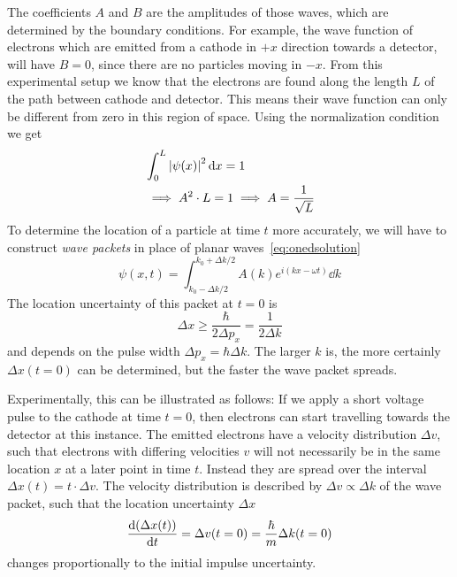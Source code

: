\documentclass[../../script.tex]{subfiles}
\begin{document}
The coefficients $A$ and $B$ are the amplitudes of those waves, which are determined by the boundary conditions.
For example, the wave function of electrons which are emitted from a cathode in $+x$ direction towards a detector, will have $B = 0$, since there are no particles moving in $-x$.
From this experimental setup we know that the electrons are found along the length $L$ of the path between cathode and detector. This means their wave function can only be different from zero in this region of space.
Using the normalization condition we get 
\begin{align*}
	&\int_0^L \abs{\psi(x)}^2 \dd{x} = 1 \\
	&\implies A^2 \cdot L = 1 \implies A = \frac{1}{\sqrt{L}}
\end{align*}
To determine the location of a particle at time $t$ more accurately, we will have to construct \textit{wave packets} in place of planar waves~\eqref{eq:onedsolution}
\begin{equation}
	\psi(x, t) = \int_{k_0 - \Delta k / 2}^{k_0 + \Delta k / 2} A(k) e^{i(kx - \omega t)} \dd{k}
\end{equation}
The location uncertainty of this packet at $t = 0$ is 
\[
	\Delta x \ge \frac{\hbar}{2 \Delta p_x} = \frac{1}{2\Delta k}
\]
and depends on the pulse width $\Delta p_x = \hbar \Delta k$. The larger $k$ is, the more certainly $\Delta x(t = 0)$ can be determined, but the faster the wave packet spreads.

Experimentally, this can be illustrated as follows: If we apply a short voltage pulse to the cathode at time $t = 0$, then electrons can start travelling towards the detector at this instance.
The emitted electrons have a velocity distribution $\Delta v$, such that electrons with differing velocities $v$ will not necessarily be in the same location $x$ at a later point in time $t$.
Instead they are spread over the interval $\Delta x(t) = t \cdot \Delta v$. The velocity distribution is described by $\Delta v \propto \Delta k$ of the wave packet, such that the location uncertainty $\Delta x$ 
\[
	\dv{(\Delta x(t))}{t} = \Delta v(t = 0) = \frac{\hbar}{m} \Delta k(t = 0)
\]
changes proportionally to the initial impulse uncertainty.
\end{document}
